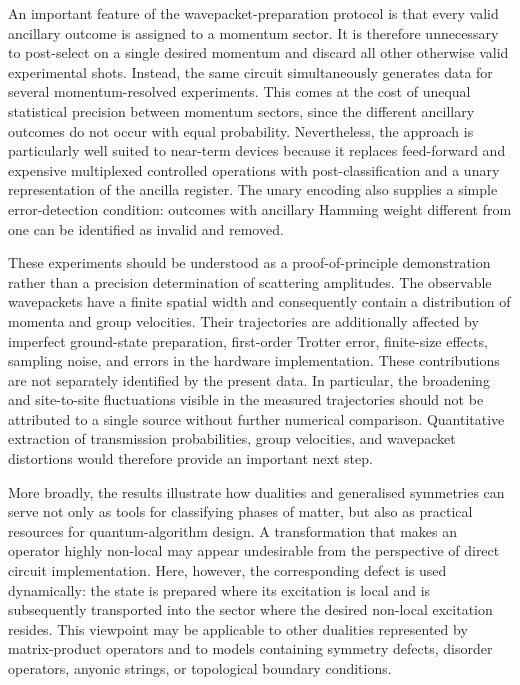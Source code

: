 \documentclass[aps,floatfix,10pt,amssymb,amsfont,amsmath,superscriptaddress,float,nofootinbib,longbibliography,nobalancelastpage,twocolumn,prx]{revtex4-2}
\begin{document}
An important feature of the wavepacket-preparation protocol is that every valid ancillary outcome is assigned to a momentum sector. It is therefore unnecessary to post-select on a single desired momentum and discard all other otherwise valid experimental shots. Instead, the same circuit simultaneously generates data for several momentum-resolved experiments. This comes at the cost of unequal statistical precision between momentum sectors, since the different ancillary outcomes do not occur with equal probability. Nevertheless, the approach is particularly well suited to near-term devices because it replaces feed-forward and expensive multiplexed controlled operations with post-classification and a unary representation of the ancilla register. The unary encoding also supplies a simple error-detection condition: outcomes with ancillary Hamming weight different from one can be identified as invalid and removed.

These experiments should be understood as a proof-of-principle demonstration rather than a precision determination of scattering amplitudes. The observable wavepackets have a finite spatial width and consequently contain a distribution of momenta and group velocities. Their trajectories are additionally affected by imperfect ground-state preparation, first-order Trotter error, finite-size effects, sampling noise, and errors in the hardware implementation. These contributions are not separately identified by the present data. In particular, the broadening and site-to-site fluctuations visible in the measured trajectories should not be attributed to a single source without further numerical comparison. Quantitative extraction of transmission probabilities, group velocities, and wavepacket distortions would therefore provide an important next step.

More broadly, the results illustrate how dualities and generalised symmetries can serve not only as tools for classifying phases of matter, but also as practical resources for quantum-algorithm design. A transformation that makes an operator highly non-local may appear undesirable from the perspective of direct circuit implementation. Here, however, the corresponding defect is used dynamically: the state is prepared where its excitation is local and is subsequently transported into the sector where the desired non-local excitation resides. This viewpoint may be applicable to other dualities represented by matrix-product operators and to models containing symmetry defects, disorder operators, anyonic strings, or topological boundary conditions.
\end{document}

